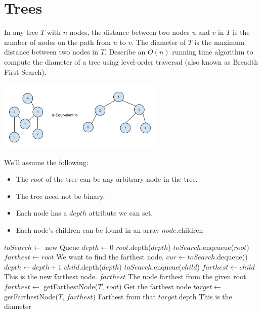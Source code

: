 \documentclass[12pt]{article}
\begin{document}
\maketitle

\section{Trees}
In any tree $T$ with $n$ nodes, the distance between two nodes $u$ and $v$ in $T$ is the number of nodes on the path from $u$ to $v$. The diameter of $T$ is the maximum distance between two nodes in $T$. Describe an $O(n)$ running time algorithm to compute the diameter of a tree using level-order traversal (also known as Breadth First Search).

\begin{center}
\includegraphics[width=0.6\textwidth]{figures/diameter1.png}
\end{center}
We'll assume the following:
\begin{itemize}
	\item The $root$ of the tree can be any arbitrary node in the tree.
	\item The tree need not be binary.
	\item Each node has a $depth$ attribute we can set.
	\item Each node's children can be found in an array $node$.children
\end{itemize}
\begin{algorithm}
\begin{algorithmic}[1]
		\State $toSearch \gets$ new Queue
		\State $depth \gets 0$
		\State $root$.depth($depth$)
		\State $toSearch$.enqeueue($root$)
		\State $farthest \gets root$
		\Comment We want to find the farthest node.
			\State $cur \gets toSearch$.dequeue()
			\State $depth \gets depth+1$
				\State $child$.depth($depth$)
				\State $toSearch$.enqueue($child$)
					\State $farthest \gets child$
					\Comment This is the new farthest node.
				\EndIf
			\EndFor
		\EndWhile
	\State \Return $farthest$
	\Comment The node farthest from the given root.
	\EndFunction
		\State $farthest \gets$ getFarthestNode($T$, $root$)
		\Comment Get the farthest node
		\State $target \gets$ getFarthestNode($T$, $farthest$)
		\Comment Farthest from that
		\State \Return $target$.depth
		\Comment This is the diameter
	\EndFunction
\end{algorithmic}
\end{algorithm}
\end{document}
